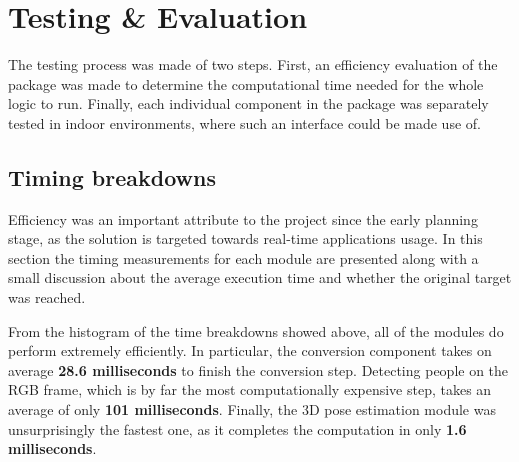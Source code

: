 \chapter{Testing \& Evaluation}
\label{chapter6}

The testing process was made of two steps. First, an efficiency evaluation of the package was made to determine the computational time needed for the whole logic to run. Finally, each individual component in the package was separately tested in indoor environments, where such an interface could be made use of.

\section{Timing breakdowns}

Efficiency was an important attribute to the project since the early planning stage, as the solution is targeted towards real-time applications usage. In this section the timing measurements for each module are presented along with a small discussion about the average execution time and whether the original target was reached.


From the histogram of the time breakdowns showed above, all of the modules do perform extremely efficiently. In particular, the conversion component takes on average \textbf{28.6 milliseconds} to finish the conversion step. Detecting people on the RGB frame, which is by far the most computationally expensive step, takes an average of only \textbf{101 milliseconds}. Finally, the 3D pose estimation module was unsurprisingly the fastest one, as it completes the computation in only \textbf{1.6 milliseconds}.

